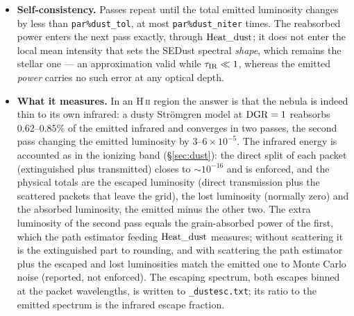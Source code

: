 \documentclass[english,a4paper]{my_memo}
\newcommand{\code}[1]{\texttt{#1}}
\begin{document}
\begin{itemize}
  the ionizing-band tallies --- without that switch the infrared would
  have been counted a second time into ${\rm Heat\_dust}$ and into the
  band field the grain photoelectric heating reads.
\item \textbf{Self-consistency.}  Passes repeat until the total emitted
  luminosity changes by less than \code{par\%dust\_tol}, at most
  \code{par\%dust\_niter} times.  The reabsorbed power enters the next
  pass exactly, through ${\rm Heat\_dust}$; it does not enter the local
  mean intensity that sets the SEDust spectral \emph{shape}, which
  remains the stellar one --- an approximation valid while
  $\tau_{\rm IR}\ll1$, whereas the emitted \emph{power} carries no such
  error at any optical depth.
\item \textbf{What it measures.}  In an H\,\textsc{ii} region the answer
  is that the nebula is indeed thin to its own infrared: a dusty
  Str\"omgren model at ${\rm DGR}=1$ reabsorbs $0.62$--$0.85\%$ of the
  emitted infrared and converges in two passes, the second pass changing
  the emitted luminosity by $3$--$6{\times}10^{-5}$.  The infrared
  energy is accounted as in the ionizing band (\S\ref{sec:dust}): the
  direct split of each packet (extinguished plus transmitted) closes to
  $\sim$$10^{-16}$ and is enforced, and the physical totals are the
  escaped luminosity (direct transmission plus the scattered packets
  that leave the grid), the lost luminosity (normally zero) and the
  absorbed luminosity, the emitted minus the other two.  The extra
  luminosity of the second pass equals the grain-absorbed power of the
  first, which the path estimator feeding ${\rm Heat\_dust}$ measures;
  without scattering it is the extinguished part to rounding, and with
  scattering the path estimator plus the escaped and lost luminosities
  match the emitted one to Monte Carlo noise (reported, not enforced).
  The escaping spectrum, both escapes binned at the packet wavelengths,
  is written to \code{\_dustesc.txt}; its ratio to the emitted spectrum
  is the infrared escape fraction.
\end{itemize}
\end{document}
